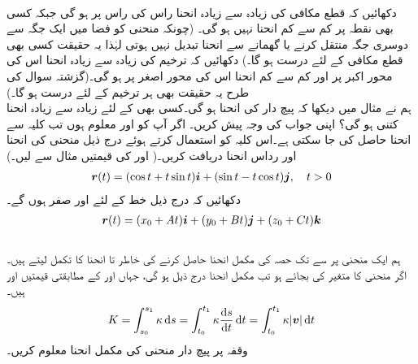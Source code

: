 \\
دکھائیں کہ قطع مکافی  کی زیادہ سے   زیادہ   انحنا راس کی  راس پر ہو گی جبکہ کسی بھی نقطہ پر کم سے کم انحنا نہیں ہو گی۔ (چونکہ منحنی کو فضا میں ایک جگہ سے دوسری جگہ منتقل کرنے یا گھمانے سے انحنا تبدیل نہیں ہوتی لہٰذا یہ حقیقت کسی بھی قطع مکافی کے لئے درست ہو گا۔)
دکھائیں کہ ترخیم  کی زیادہ سے زیادہ انحنا اس کی  محور اکبر پر اور کم سے کم انحنا اس کی محور اصغر  پر ہو گی۔(گزشتہ سوال کی طرح یہ حقیقت بھی ہر ترخیم کے لئے درست ہو گا۔)
\\
ہم نے مثال  میں دیکھا کہ پیچ دار   کی انحنا  ہو گی۔کسی بھی  کے لئے زیادہ سے زیادہ انحنا کتنی ہو گی؟ اپنی جواب کی وجہ پیش کریں۔ 
اگر آپ کو  اور  معلوم ہوں تب کلیہ  سے انحنا حاصل کی جا سکتی ہے۔اس کلیہ کو استعمال کرتے ہوئے درج ذیل منحنی کی انحنا اور رداس انحنا دریافت کریں۔( اور  کی قیمتیں مثال  سے لیں۔)
\begin{align*}
{\ensuremath{{\boldsymbol{r}}}}(t)=(\cos t+t\sin t){\boldsymbol{i}}+(\sin t-t\cos t){\boldsymbol{j}},\quad t>0
\end{align*}
دکھائیں کہ درج ذیل خط کے لئے  اور  صفر ہوں گے۔
\begin{align*}
{\ensuremath{{\boldsymbol{r}}}}(t)=(x_0+At){\boldsymbol{i}}+(y_0+Bt){\boldsymbol{j}}+(z_0+Ct){\boldsymbol{k}}
\end{align*}
\\
ہم ایک منحنی پر    سے   تک حصہ کی مکمل انحنا حاصل کرنے کی خاطر  تا  انحنا  کا تکمل لیتے ہیں۔ اگر منحنی کا متغیر   کی بجائے  ہو تب مکمل انحنا درج ذیل ہو گی، جہاں  اور  کے مطابقتی قیمتیں  اور  ہیں۔
\begin{align*}
K=\int_{s_0}^{s_1}\kappa\dif s=\int_{t_0}^{t_1}\kappa\frac{\dif s}{\dif t}\dif t=\int_{t_0}^{t_1}\kappa\abs{\kvec{v}}\dif t
\end{align*}
وقفہ  پر پیچ دار منحنی  کی مکمل انحنا معلوم کریں۔
